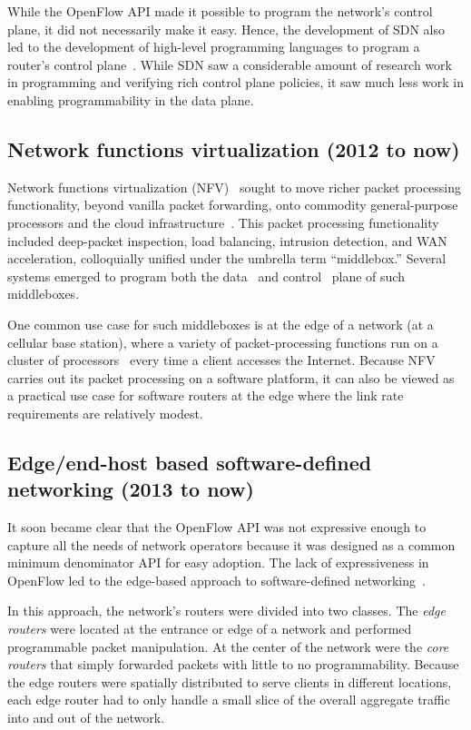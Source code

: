 While the OpenFlow API made it possible to program the network's control plane,
it did not necessarily make it easy. Hence, the development of SDN also led to
the development of high-level programming languages to program a router's
control plane~\cite{frenetic, pyretic}. While SDN saw a considerable amount of
research work in programming and verifying rich control plane policies, it saw
much less work in enabling programmability in the data plane.

\subsection{Network functions virtualization (2012 to now)}
Network functions virtualization (NFV)~\cite{nfv_etsi_2012} sought to move
richer packet processing functionality, beyond vanilla packet forwarding, onto
commodity general-purpose processors and the cloud
infrastructure~\cite{aplomb}. This packet processing functionality included
deep-packet inspection, load balancing, intrusion detection, and WAN
acceleration, colloquially unified under the umbrella term ``middlebox.''
Several systems emerged to program both the data~\cite{netbricks} and
control~\cite{opennf} plane of such middleboxes.

One common use case for such middleboxes is at the edge of a network (\eg at a
cellular base station), where a variety of packet-processing functions run on a
cluster of processors~\cite{e2} every time a client accesses the Internet.
Because NFV carries out its packet processing on a software platform, it can
also be viewed as a practical use case for software routers at the edge where
the link rate requirements are relatively modest.

\subsection{Edge/end-host based software-defined networking (2013 to now)}
It soon became clear that the OpenFlow API was not expressive enough to capture
all the needs of network operators because it was designed as a common minimum
denominator API for easy adoption. The lack of expressiveness in OpenFlow led
to the edge-based approach to software-defined networking~\cite{fabric_sdn,
nvp, openvswitch}.

In this approach, the network's routers were divided into two classes. The {\em
edge routers} were located at the entrance or edge of a network and performed
programmable packet manipulation. At the center of the network were the {\em
core routers} that simply forwarded packets with little to no programmability.
Because the edge routers were spatially distributed to serve clients in
different locations, each edge router had to only handle a small slice of the
overall aggregate traffic into and out of the network.

